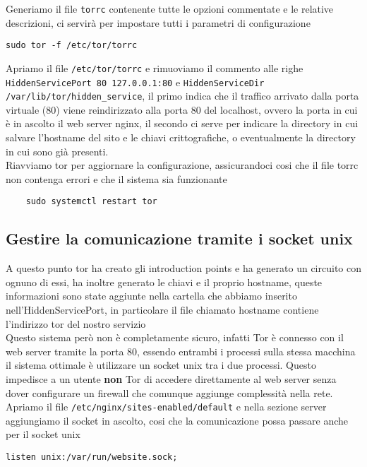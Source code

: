 \cite{TorRepo}

Generiamo il file \lstinline{torrc} contenente tutte le opzioni commentate e le relative descrizioni, ci servirà per impostare tutti i parametri di configurazione 
\begin{lstlisting}[caption={Generazione file torrc}]
    sudo tor -f /etc/tor/torrc
\end{lstlisting}

Apriamo il file \lstinline{/etc/tor/torrc} e rimuoviamo il commento alle righe \lstinline{HiddenServicePort 80 127.0.0.1:80} e \lstinline{HiddenServiceDir /var/lib/tor/hidden_service}, il primo indica che il traffico arrivato dalla porta virtuale (80) viene reindirizzato alla porta 80 del localhost, ovvero la porta in cui è in ascolto il web server nginx, il secondo ci serve per indicare la directory in cui salvare l'hostname del sito e le chiavi crittografiche, o eventualmente la directory in cui sono già presenti. \\

Riavviamo tor per aggiornare la configurazione, assicurandoci cosi che il file torrc non contenga errori e che il sistema sia funzionante
\begin{lstlisting}
    sudo systemctl restart tor
\end{lstlisting}

\subsection{Gestire la comunicazione tramite i socket unix}
A questo punto tor ha creato gli introduction points e ha generato un circuito con ognuno di essi, ha inoltre generato le chiavi e il proprio hostname, queste informazioni sono state aggiunte nella cartella che abbiamo inserito nell'HiddenServicePort, in particolare il file chiamato hostname contiene l'indirizzo tor del nostro servizio \cite{SetupOnionService} \\
Questo sistema però non è completamente sicuro, infatti Tor è connesso con il web server tramite la porta 80, essendo entrambi i processi sulla stessa macchina il sistema ottimale è utilizzare un socket unix tra i due processi. 
Questo impedisce a un utente \textbf{non} Tor di accedere direttamente al web server senza dover configurare un firewall che comunque aggiunge complessità nella rete. \\
Apriamo il file \lstinline{/etc/nginx/sites-enabled/default} e nella sezione server aggiungiamo il socket in ascolto, cosi che la comunicazione possa passare anche per il socket unix
\begin{lstlisting}[caption={Aggiunta/creazione socket unix}]
    listen unix:/var/run/website.sock;
\end{lstlisting}

